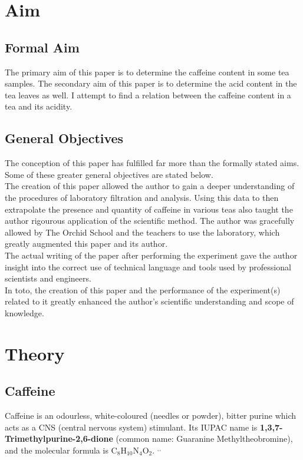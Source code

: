 \documentclass[11pt]{article}
\begin{document}
\newpage

\section{Aim}

\subsection{Formal Aim}
The primary aim of this paper is to determine the caffeine content in some tea samples. The
secondary aim of this paper is to determine the acid content in the tea leaves as well. I attempt
to find a relation between the caffeine content in a tea and its acidity.

\subsection{General Objectives}
The conception of this paper has fulfilled far more than the formally stated aims. Some of these
greater general objectives are stated below. \\
The creation of this paper allowed the author to gain a deeper understanding of the
procedures of laboratory filtration and analysis. Using this data to then extrapolate the presence
and quantity of caffeine in various teas also taught the author rigourous application of the
scientific method. The author was gracefully allowed by The Orchid School and the teachers to use
the laboratory, which greatly augmented this paper and its author. \\
The actual writing of the paper after performing the experiment gave the
author insight into the correct use of technical language and tools used by professional scientists
and engineers. \\
In toto, the creation of this paper and the performance of the experiment(s) related to it greatly
enhanced the author's scientific understanding and scope of knowledge.


\newpage

\section{Theory}

\subsection{Caffeine}

Caffeine is an odourless, white-coloured (needles or powder), bitter purine which acts as a CNS (central nervous system)
stimulant. Its IUPAC name is \textbf{    1,3,7-Trimethylpurine-2,6-dione} (common name: Guaranine
Methyltheobromine), and the molecular formula is
$\mathrm{C_8H_{10}N_4O_2}$. \cite{struct1}$^,$\cite{struct2}$^,$\cite{struct3} \\
\end{document}
